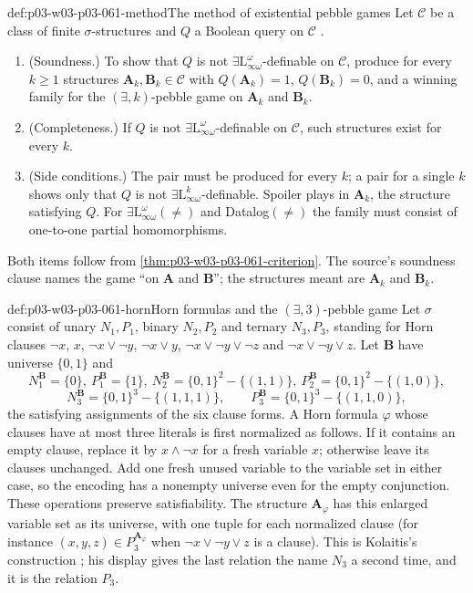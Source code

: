 \begin{hbmethod}{def:p03-w03-p03-061-method}{The method of existential pebble games}
Let \(\mathcal C\) be a class of finite \(\sigma\)-structures and \(Q\) a
Boolean query on \(\mathcal C\)
\cite[Method~8.9, p.~73]{Kolaitis2003ExpressivePowerNotes}.
\begin{enumerate}
\item (Soundness.) To show that \(Q\) is not
      \(\exists\mathrm L^\omega_{\infty\omega}\)-definable on \(\mathcal C\),
      produce for every \(k\ge1\) structures \(\mathbf A_k,\mathbf B_k\in
      \mathcal C\) with \(Q(\mathbf A_k)=1\), \(Q(\mathbf B_k)=0\), and a
      winning family for the \((\exists,k)\)-pebble game on \(\mathbf A_k\)
      and \(\mathbf B_k\).
\item (Completeness.) If \(Q\) is not
      \(\exists\mathrm L^\omega_{\infty\omega}\)-definable on \(\mathcal C\),
      such structures exist for every \(k\).
\item (Side conditions.) The pair must be produced for every \(k\); a pair
      for a single \(k\) shows only that \(Q\) is not
      \(\exists\mathrm L^k_{\infty\omega}\)-definable. Spoiler plays in
      \(\mathbf A_k\), the structure satisfying \(Q\). For
      \(\exists\mathrm L^\omega_{\infty\omega}(\neq)\) and Datalog\((\neq)\)
      the family must consist of one-to-one partial homomorphisms.
\end{enumerate}
Both items follow from \cref{thm:p03-w03-p03-061-criterion}. The source's
soundness clause names the game ``on \(\mathbf A\) and \(\mathbf B\)''; the
structures meant are \(\mathbf A_k\) and \(\mathbf B_k\).
\end{hbmethod}

\begin{hbexample}{def:p03-w03-p03-061-horn}{Horn formulas and the \((\exists,3)\)-pebble game}
Let \(\sigma\) consist of unary \(N_1,P_1\), binary \(N_2,P_2\) and ternary
\(N_3,P_3\), standing for Horn clauses \(\neg x\), \(x\), \(\neg x\vee\neg
y\), \(\neg x\vee y\), \(\neg x\vee\neg y\vee\neg z\) and \(\neg x\vee\neg
y\vee z\). Let \(\mathbf B\) have universe \(\{0,1\}\) and
\[
 N_1^{\mathbf B}=\{0\},\ P_1^{\mathbf B}=\{1\},\
 N_2^{\mathbf B}=\{0,1\}^2-\{(1,1)\},\
 P_2^{\mathbf B}=\{0,1\}^2-\{(1,0)\},
\]
\[
 N_3^{\mathbf B}=\{0,1\}^3-\{(1,1,1)\},\qquad
 P_3^{\mathbf B}=\{0,1\}^3-\{(1,1,0)\},
\]
the satisfying assignments of the six clause forms. A Horn formula
\(\varphi\) whose clauses have at most three literals is first normalized
as follows. If it contains an empty clause, replace it by \(x\wedge\neg x\)
for a fresh variable \(x\); otherwise leave its clauses unchanged. Add one
fresh unused variable to the variable set in either case, so the encoding
has a nonempty universe even for the empty conjunction. These operations
preserve satisfiability. The structure \(\mathbf A_\varphi\) has this
enlarged variable set as its universe, with one tuple for each normalized
clause (for instance
\((x,y,z)\in P_3^{\mathbf A_\varphi}\) when \(\neg x\vee\neg y\vee z\) is a
clause). This is Kolaitis's construction
\cite[proof of Prop.~8.11, p.~76]{Kolaitis2003ExpressivePowerNotes}; his
display gives the last relation the name \(N_3\) a second time, and it is the
relation \(P_3\).
\end{hbexample}

